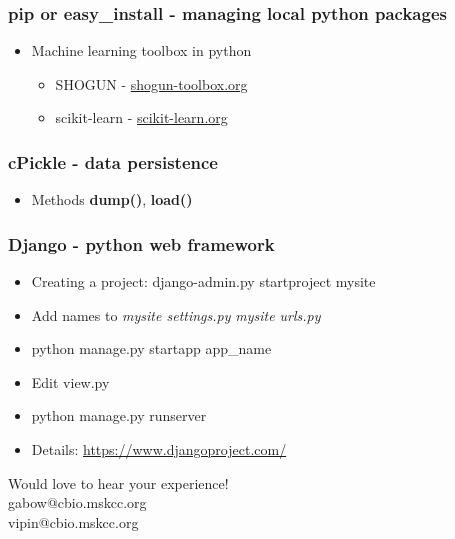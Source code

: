 \documentclass[11pt]{beamer}
\makeatletter
\newcommand{\thankyou}
{\begin{center} Would love to hear your experience! \\  gabow@cbio.mskcc.org \\ vipin@cbio.mskcc.org \end{center}}
\makeatother
\begin{document}
%
\begin{frame}[plain]
    \frametitle{pip or easy\_install - managing local python packages}
    \begin{itemize}
        \item[] Machine learning toolbox in python
        \begin{itemize}
            \item []SHOGUN - \url{shogun-toolbox.org}
            \item []scikit-learn - \url{scikit-learn.org} 
        \end{itemize}
        
    \end{itemize}
\end{frame}
%
\begin{frame}[plain]
    \frametitle{\textbf{cPickle} - data persistence}
    \begin{itemize}
        \item[] Methods \textbf{dump()}, \textbf{load()} 
        \newline
        
        
    \end{itemize}
\end{frame}
%
\begin{frame}[plain]
    \frametitle{Django - python web framework}
    \begin{itemize}
        \item[] Creating a project: django-admin.py startproject mysite 
        \newline
        \pause 
        \item[] Add names to \textit{mysite settings.py} \textit{mysite urls.py} 
        \pause 
        \item[] python manage.py startapp app\_name
        \pause 
        \item[] Edit view.py 
        
        \pause 
        \item[] python manage.py runserver
        \item[] Details: \url{https://www.djangoproject.com/}
    \end{itemize}
\end{frame}
%
\begin{frame}[plain]
    \thankyou
\end{frame}
\end{document}
